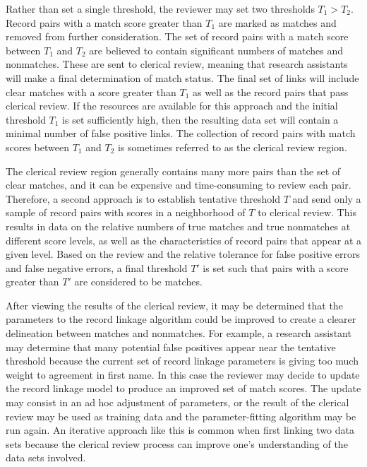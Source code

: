\documentclass[]{krantz}
\begin{document}
Rather than set a single threshold, the reviewer may set two thresholds
\(T_1 > T_2\). Record pairs with a match score greater than \(T_1\) are
marked as matches and removed from further consideration. The set of
record pairs with a match score between \(T_1\) and \(T_2\) are believed
to contain significant numbers of matches and nonmatches. These are sent
to clerical review, meaning that research assistants will make a final
determination of match status. The final set of links will include clear
matches with a score greater than \(T_1\) as well as the record pairs
that pass clerical review. If the resources are available for this
approach and the initial threshold \(T_1\) is set sufficiently high,
then the resulting data set will contain a minimal number of false
positive links. The collection of record pairs with match scores between
\(T_1\) and \(T_2\) is sometimes referred to as the clerical review
region.

The clerical review region generally contains many more pairs than the
set of clear matches, and it can be expensive and time-consuming to
review each pair. Therefore, a second approach is to establish tentative
threshold \(T\) and send only a sample of record pairs with scores in a
neighborhood of \(T\) to clerical review. This results in data on the
relative numbers of true matches and true nonmatches at different score
levels, as well as the characteristics of record pairs that appear at a
given level. Based on the review and the relative tolerance for false
positive errors and false negative errors, a final threshold \(T'\) is
set such that pairs with a score greater than \(T'\) are considered to
be matches.

After viewing the results of the clerical review, it may be determined
that the parameters to the record linkage algorithm could be improved to
create a clearer delineation between matches and nonmatches. For
example, a research assistant may determine that many potential false
positives appear near the tentative threshold because the current set of
record linkage parameters is giving too much weight to agreement in
first name. In this case the reviewer may decide to update the record
linkage model to produce an improved set of match scores. The update may
consist in an ad hoc adjustment of parameters, or the result of the
clerical review may be used as training data and the parameter-fitting
algorithm may be run again. An iterative approach like this is common
when first linking two data sets because the clerical review process can
improve one's understanding of the data sets involved.
\end{document}
